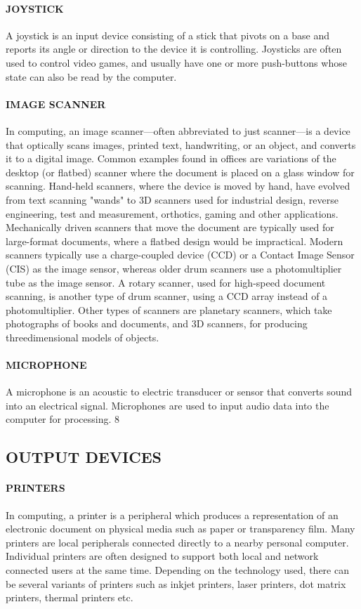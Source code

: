 \documentclass{article}
\begin{document}
\paragraph {JOYSTICK}
 A joystick is an input device consisting of a stick that pivots on a base and reports its angle or
direction to the device it is controlling. Joysticks are often used to control video games, and usually
have one or more push-buttons whose state can also be read by the computer.
\paragraph {IMAGE SCANNER}
 In computing, an image scanner—often abbreviated to just scanner—is a device that
optically scans images, printed text, handwriting, or an object, and converts it to a digital image.
Common examples found in offices are variations of the desktop (or flatbed) scanner where the
document is placed on a glass window for scanning. Hand-held scanners, where the device is moved by
hand, have evolved from text scanning "wands" to 3D scanners used for industrial design, reverse
engineering, test and measurement, orthotics, gaming and other applications. Mechanically driven
scanners that move the document are typically used for large-format documents, where a flatbed design
would be impractical. Modern scanners typically use a charge-coupled device (CCD) or a Contact
Image Sensor (CIS) as the image sensor, whereas older drum scanners use a photomultiplier tube as the
image sensor. A rotary scanner, used for high-speed document scanning, is another type of drum
scanner, using a CCD array instead of a photomultiplier. Other types of scanners are planetary
scanners, which take photographs of books and documents, and 3D scanners, for producing threedimensional
models of objects.
\paragraph {MICROPHONE} 
A microphone is an acoustic to electric transducer or sensor that converts sound into an
electrical signal. Microphones are used to input audio data into the computer for processing.
8
\subsection{ OUTPUT DEVICES}
\paragraph{ PRINTERS}
 In computing, a printer is a peripheral which produces a representation of an electronic
document on physical media such as paper or transparency film. Many printers are local peripherals
connected directly to a nearby personal computer. Individual printers are often designed to support both
local and network connected users at the same time. Depending on the technology used, there can be
several variants of printers such as inkjet printers, laser printers, dot matrix printers, thermal printers
etc.
\end{document}
